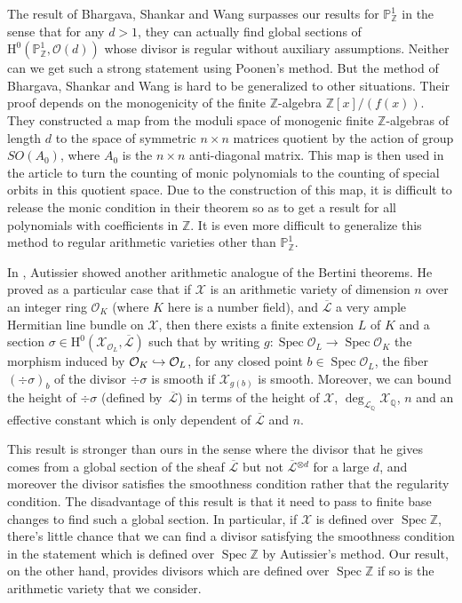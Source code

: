 \documentclass[JEP,XML,SOM,Unicode,published]{cedram}
\newcommand\hto{\mathrel{\lhook\joinrel\to}}
\theoremstyle{plain}
\theoremstyle{definition}
\newcommand{\ho}{\mathrm{H}}
\newcommand{\X}{\mathcal{X}}
\newcommand{\Li}{\overline{\mathcal{L}}{}}
\newcommand{\li}{\mathcal{L}}
\newcommand{\Q}{\mathbb{Q}}
\newcommand{\Z}{\mathbb{Z}}
\newcommand{\pr}{\mathbb{P}}
\DeclareMathOperator{\Spec}{Spec}
\begin{document}
The result of Bhargava, Shankar and Wang surpasses our results for $\pr^1_{\Z}$ in the sense that for any $d>1$, they can actually find global sections of $\ho^0(\pr^1_{\Z}, \mathcal{O}(d))$ whose divisor is regular without auxiliary assumptions. Neither can we get such a strong statement using Poonen's method. But the method of Bhargava, Shankar and Wang is hard to be generalized to other situations. Their proof depends on the monogenicity of the finite $\Z$-algebra $\Z[x]/(f(x))$. They constructed a map from the moduli space of monogenic finite $\Z$-algebras of length $d$ to the space of symmetric $n\times n$ matrices quotient by the action of group $SO(A_0)$, where $A_0$ is the $n\times n$ anti-diagonal matrix. This map is then used in the article to turn the counting of monic polynomials to the counting of special orbits in this quotient space. Due to the construction of this map, it is difficult to release the monic condition in their theorem so as to get a result for all polynomials with coefficients in $\Z$. It is even more difficult to generalize this method to regular arithmetic varieties other than $\pr^1_{\Z}$.\enlargethispage{\baselineskip}

In \cite{Au01}, Autissier showed another arithmetic analogue of the Bertini theorems. He proved as a particular case that if $\X$ is an arithmetic variety of dimension $n$ over an integer ring $\mathcal{O}_K$ (where $K$ here is a number field), and $\Li$ a very ample Hermitian line bundle on $\X$, then there exists a finite extension $L$ of $K$ and a section $\sigma\in \ho^0(\X_{\mathcal{O}_L}, \Li)$ such that by writing $g:\Spec \mathcal{O}_L\to \Spec \mathcal{O}_K$ the morphism induced by $\mathcal{O}_K\hto \mathcal{O}_L$, for any closed point $b\in \Spec \mathcal{O}_L$, the fiber $(\div \sigma)_b$ of the divisor $\div \sigma$ is smooth if $\X_{g(b)}$ is smooth. Moreover, we can bound the height of $\div \sigma$ (defined by~$\Li$) in terms of the height of $\X$, $\deg_{\li_{\Q}}\X_{\Q}$, $n$ and an effective constant which is only dependent of $\Li$ and $n$.

This result is stronger than ours in the sense where the divisor that he gives comes from a global section of the sheaf $\Li$ but not $\Li^{\otimes d}$ for a large $d$, and moreover the divisor satisfies the smoothness condition rather that the regularity condition. The disadvantage of this result is that it need to pass to finite base changes to find such a global section. In particular, if $\X$ is defined over $\Spec \Z$, there's little chance that we can find a divisor satisfying the smoothness condition in the statement which is defined over $\Spec \Z$ by Autissier's method. Our result, on the other hand, provides divisors which are defined over $\Spec \Z$ if so is the arithmetic variety that we consider.
\end{document}
